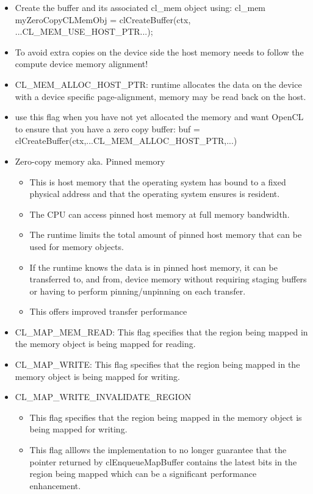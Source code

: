 \documentclass[paper=a4, fontsize=11pt]{scrartcl} %
\numberwithin{equation}{section} %
\numberwithin{figure}{section} %
\numberwithin{table}{section} %
\begin{document}
\begin{itemize}
\begin{itemize}
\begin{itemize}
      \item Create the buffer and its associated cl_mem object using: cl_mem myZeroCopyCLMemObj = clCreateBuffer(ctx, ...CL_MEM_USE_HOST_PTR...);
      \item To avoid extra copies on the device side the host memory needs to follow the compute device memory alignment!
      \item CL_MEM_ALLOC_HOST_PTR: runtime allocates the data on the device with a device specific page-alignment, memory may be read back on the host.
      \item use this flag when you have not yet allocated the memory and want OpenCL to ensure that you have a zero copy buffer: buf = clCreateBuffer(ctx,...CL_MEM_ALLOC_HOST_PTR,...)
      \item Zero-copy memory aka. Pinned memory
      \begin{itemize}
        \item This is host memory that the operating system has bound to a fixed physical address and that the operating system ensures is resident.
        \item The CPU can access pinned host memory at full memory bandwidth.
        \item The runtime limits the total amount of pinned host memory that can be used for memory objects.
        \item If the runtime knows the data is in pinned host memory, it can be transferred to, and from, device memory without requiring staging buffers or having to perform pinning/unpinning on each transfer.
        \item This offers improved transfer performance
      \end{itemize}
      \item CL_MAP_MEM_READ: This flag specifies that the region being mapped in the memory object is being mapped for reading.
      \item CL_MAP_WRITE: This flag specifies that the region being mapped in the memory object is being mapped for writing.
      \item CL_MAP_WRITE_INVALIDATE_REGION
      \begin{itemize}
        \item This flag specifies that the region being mapped in the memory object is being mapped for writing.
        \item This flag alllows the implementation to no longer guarantee that the pointer returned by clEnqueueMapBuffer contains the latest bits in the region being mapped which can be a significant performance enhancement.

\end{itemize}
\end{itemize}
\end{itemize}
\end{itemize}
\end{document}
